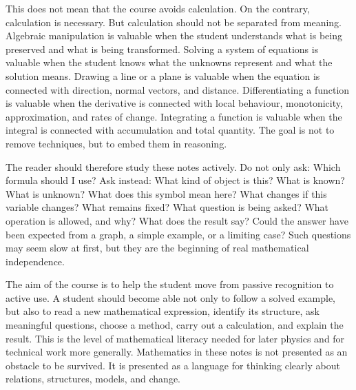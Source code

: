 This does not mean that the course avoids calculation. On the contrary, calculation is necessary. But calculation should not be separated from meaning. Algebraic manipulation is valuable when the student understands what is being preserved and what is being transformed. Solving a system of equations is valuable when the student knows what the unknowns represent and what the solution means. Drawing a line or a plane is valuable when the equation is connected with direction, normal vectors, and distance. Differentiating a function is valuable when the derivative is connected with local behaviour, monotonicity, approximation, and rates of change. Integrating a function is valuable when the integral is connected with accumulation and total quantity. The goal is not to remove techniques, but to embed them in reasoning.

The reader should therefore study these notes actively. Do not only ask: Which formula should I use? Ask instead: What kind of object is this? What is known? What is unknown? What does this symbol mean here? What changes if this variable changes? What remains fixed? What question is being asked? What operation is allowed, and why? What does the result say? Could the answer have been expected from a graph, a simple example, or a limiting case? Such questions may seem slow at first, but they are the beginning of real mathematical independence.

The aim of the course is to help the student move from passive recognition to active use. A student should become able not only to follow a solved example, but also to read a new mathematical expression, identify its structure, ask meaningful questions, choose a method, carry out a calculation, and explain the result. This is the level of mathematical literacy needed for later physics and for technical work more generally. Mathematics in these notes is not presented as an obstacle to be survived. It is presented as a language for thinking clearly about relations, structures, models, and change.
